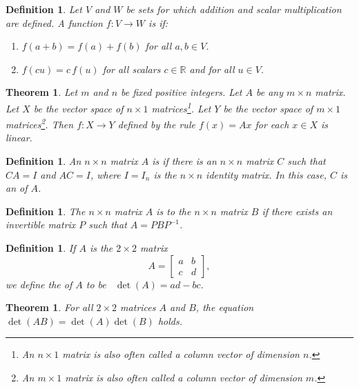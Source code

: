 \documentclass{book}
\newcounter{ekcounter}%
\theoremstyle{ekimcustom}
\newtheorem{theorem}[ekcounter]{Theorem}
\newtheorem{definition}[ekcounter]{Definition}
\newcommand\defn[1]{{\color{blue}{\bf #1}}}
\begin{document}
\begin{definition}
Let $V$ and $W$ be sets for which addition and scalar multiplication are defined. A function $f : V \to W$ is \defn{linear} if:
\begin{enumerate}
\item\quad $f(a+b)=f(a)+f(b)$ for all $a,b \in V$.
\item\quad $f(cu)=c\,f(u)$ for all scalars $c \in \mathbb{R}$ and for all $u \in V$.
\end{enumerate}
\end{definition}

\begin{theorem}
Let $m$ and $n$ be fixed positive integers. Let $A$ be any $m \times n$ matrix.
Let $X$ be the vector space of $n \times 1$ matrices\footnote{An $n \times 1$ matrix is also often called a column vector of dimension $n$.}.
Let $Y$ be the vector space of $m \times 1$ matrices\footnote{An $m \times 1$ matrix is also often called a column vector of dimension $m$.}.
Then $f : X \to Y$ defined by the rule $f(x)=Ax$ for each $x \in X$ is linear.
\end{theorem}

\begin{definition}
An $n \times n$ matrix $A$ is \defn{invertible} if there is an $n \times n$ matrix $C$ such that $CA=I$ and $AC=I$, where $I=I_n$ is the $n \times n$ identity matrix. In this case, $C$ is an \defn{inverse} of $A$.
\end{definition}

\begin{definition}
The $n \times n$ matrix $A$ is \defn{similar} to the $n \times n$ matrix $B$ if there exists an invertible matrix $P$ such that $A=PBP^{-1}$.
\end{definition}

\begin{definition}
If $A$ is the $2 \times 2$ matrix
\[A=\left[\begin{array}{cc}a&b\\c&d\end{array}\right],\]
we define the \defn{determinant} of $A$ to be\,\,\, $\det(A) = ad-bc$.
\end{definition}

\begin{theorem}
For all $2 \times 2$ matrices $A$ and $B$, the equation $\det(AB)=\det(A)\det(B)$ holds.
\end{theorem}
\end{document}
